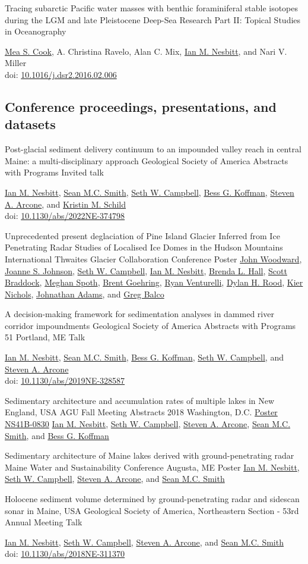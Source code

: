 \documentclass[a4paper,12pt,sans,colorlinks]{moderncv}
\newcommand{\me}{\href{https://www.iannesbitt.org}{Ian M. Nesbitt}}
\newcommand{\seth}{\href{https://www.alpinesciences.net}{Seth W. Campbell}}
\newcommand{\sean}{\href{https://umaine.edu/earthclimate/people/sean-m-c-smith/}{Sean M.C. Smith}}
\newcommand{\bess}{\href{https://www.colby.edu/directory/profile/bess.koffman/}{Bess G. Koffman}}
\newcommand{\stevearcone}{\href{https://engineering.dartmouth.edu/community/faculty/steven-arcone}{Steven A. Arcone}}
\newcommand{\kristin}{\href{https://climatechange.umaine.edu/people/kristin-schild/}{Kristin M. Schild}}
\newcommand{\mea}{\href{https://geosciences.williams.edu/profile/msc1/}{Mea S. Cook}}
\newcommand{\johnwoodward}{\href{https://www.northumbria.ac.uk/about-us/our-staff/w/john-woodward}{John Woodward}}
\newcommand{\joannejohnson}{\href{https://www.bas.ac.uk/profile/jsj/}{Joanne S. Johnson}}
\newcommand{\brenda}{\href{https://climatechange.umaine.edu/people/brenda-hall/}{Brenda L. Hall}}
\newcommand{\scott}{\href{https://climatechange.umaine.edu/people/scott-braddock/}{Scott Braddock}}
\newcommand{\meghan}{\href{https://climatechange.umaine.edu/people/meghan-spoth/}{Meghan Spoth}}
\newcommand{\brent}{\href{https://sse.tulane.edu/eens/faculty/goehring}{Brent Goehring}}
\newcommand{\ryanventurelli}{\href{https://sse.tulane.edu/eens/faculty/venturelli}{Ryan Venturelli}}
\newcommand{\dylanrood}{\href{http://www.imperial.ac.uk/people/d.rood}{Dylan H. Rood}}
\newcommand{\kiernichols}{\href{https://www.researchgate.net/profile/Keir-Nichols}{Kier Nichols}}
\newcommand{\johnathanadams}{\href{https://thwaitesglacier.org/people/jonathan-adams}{Johnathan Adams}}
\newcommand{\gregbalco}{\href{https://www.bgc.org/greg-balco}{Greg Balco}}
\newcommand{\agudc}{\href{https://agu.confex.com/agu/fm18/meetingapp.cgi/Paper/449070}{Poster NS41B-0830}}
\newcommand{\doi}[1]{%
    \href{https://doi.org/#1}{#1}
}
\begin{document}
{Tracing subarctic Pacific water masses with benthic
foraminiferal stable isotopes during the LGM and late
Pleistocene}
{Deep-Sea Research Part II: Topical Studies in Oceanography}
{}
{}
{
    \mea{}, A. Christina Ravelo, Alan C. Mix, \me{},
    and Nari V. Miller
    \\
    doi: \doi{10.1016/j.dsr2.2016.02.006}
}


\newpage
\subsection{Conference proceedings, presentations, and datasets}

{Post-glacial sediment delivery continuum to an impounded
valley reach in central Maine: a multi-disciplinary approach}
{Geological Society of America Abstracts with Programs}
{}
{Invited talk}
{
    \me{}, \sean{}, \seth{}, \bess{}, \stevearcone{}, and \kristin{}
    \\
    doi: \doi{10.1130/abs/2022NE-374798}
}

{Unprecedented present deglaciation of Pine Island Glacier
Inferred from Ice Penetrating Radar Studies of Localised
Ice Domes in the Hudson Mountains}
{International Thwaites Glacier Collaboration Conference}
{}
{Poster}
{
    \johnwoodward{}, \joannejohnson{}, \seth{}, \me{}, \brenda{}, \scott{},
    \meghan{}, \brent{}, \ryanventurelli{}, \dylanrood{}, \kiernichols{},
    \johnathanadams{}, and \gregbalco{}
}

{A decision-making framework for sedimentation analyses in
dammed river corridor impoundments}
{Geological Society of America Abstracts with Programs 51}
{Portland, ME}
{Talk}
{
    \me{}, \sean{}, \bess{}, \seth{}, and \stevearcone{}
    \\
    doi: \doi{10.1130/abs/2019NE-328587}
}

{Sedimentary architecture and accumulation rates of
multiple lakes in New England, USA}
{AGU Fall Meeting Abstracts 2018}
{Washington, D.C.}
{\agudc}
{
    \me{}, \seth{}, \stevearcone{}, \sean{}, and \bess{}
}

{Sedimentary architecture of Maine lakes derived
with ground-penetrating radar}
{Maine Water and Sustainability Conference}
{Augusta, ME}
{Poster}
{
    \me{}, \seth{}, \stevearcone{}, and \sean{}
}

{Holocene sediment volume determined by
ground-penetrating radar and sidescan sonar in Maine, USA}
{Geological Society of America, Northeastern Section - 53rd Annual Meeting}
{}
{Talk}
{
    \me{}, \seth{}, \stevearcone{}, and \sean{}
    \\
    doi: \doi{10.1130/abs/2018NE-311370}
}
\end{document}

